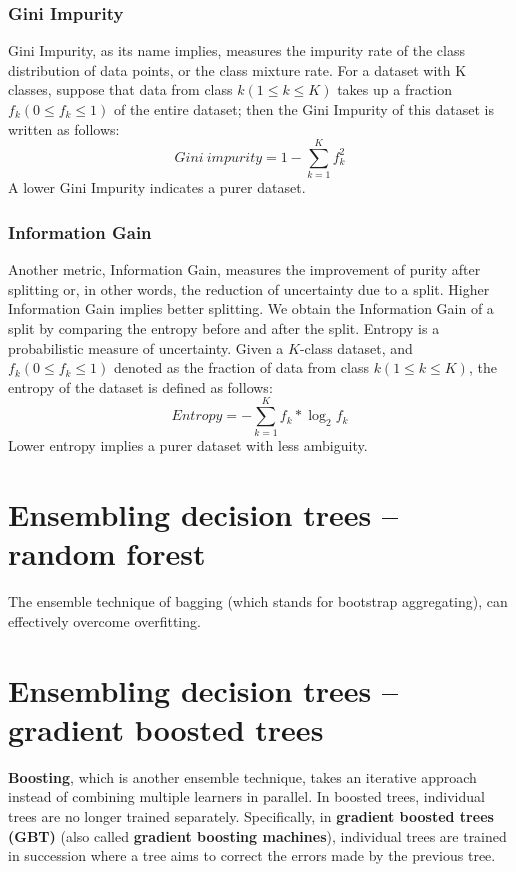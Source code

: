 \subsubsection*{Gini Impurity}
Gini Impurity, as its name implies, measures the impurity rate of the class distribution of data points, or the class mixture rate. For a dataset with K classes, suppose that data from class $k(1 \leq k \leq K)$ takes up a fraction $f_k(0 \leq f_k \leq 1)$ of the entire dataset; then the Gini Impurity of this dataset is written as follows:
$$Gini~impurity=1-\sum_{k=1}^Kf_k^2$$
A lower Gini Impurity indicates a purer dataset.

\subsubsection*{Information Gain}
Another metric, Information Gain, measures the improvement of purity after splitting or, in other words, the reduction of uncertainty due to a split. Higher Information Gain implies better splitting. We obtain the Information Gain of a split by comparing the entropy before and after the split. Entropy is a probabilistic measure of uncertainty. Given a $K$-class dataset, and $f_k (0 \leq f_k \leq 1)$ denoted as the fraction of data from class $k (1 \leq k \leq K)$, the entropy of the dataset is defined as follows:
$$Entropy = -\sum_{k=1}^Kf_k*\log_2f_k$$
Lower entropy implies a purer dataset with less ambiguity.

\section{Ensembling decision trees – random forest}
The ensemble technique of bagging (which stands for bootstrap aggregating), can effectively overcome overfitting.
\section{Ensembling decision trees – gradient boosted trees}
\textbf{Boosting}, which is another ensemble technique, takes an iterative approach instead of combining multiple learners in parallel. In boosted trees, individual trees are no longer trained separately. Specifically, in \textbf{gradient boosted trees (GBT)} (also called \textbf{gradient boosting machines}), individual trees are trained in succession where a tree aims to correct the errors made by the previous tree.
